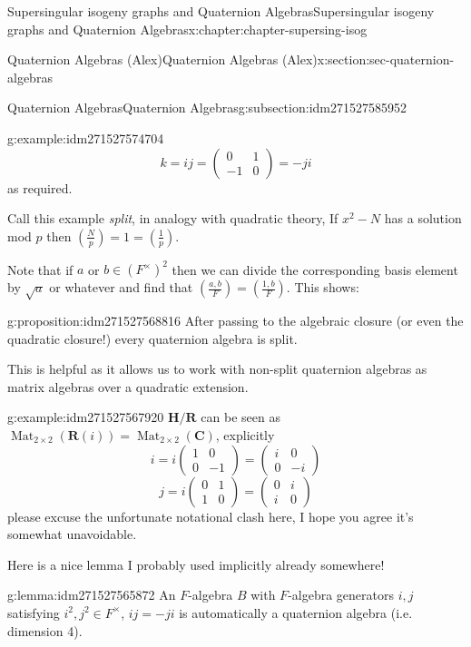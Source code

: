 \documentclass[oneside,10pt,]{book}
\numberwithin{equation}{section}
\newcommand{\legendre}[2]{\left(\frac{#1}{#2}\right)}
\newcommand{\RR}{\mathbf{R}}
\newcommand{\CC}{\mathbf{C}}
\newcommand{\HH}{\mathbf{H}}
\DeclareMathOperator{\Mat}{Mat}
\newcommand{\amp}{&}
\begin{document}
\begin{chapterptx}{Supersingular isogeny graphs and Quaternion Algebras}{}{Supersingular isogeny graphs and Quaternion Algebras}{}{}{x:chapter:chapter-supersing-isog}
\begin{sectionptx}{Quaternion Algebras (Alex)}{}{Quaternion Algebras (Alex)}{}{}{x:section:sec-quaternion-algebras}
\begin{subsectionptx}{Quaternion Algebras}{}{Quaternion Algebras}{}{}{g:subsection:idm271527585952}
\begin{introduction}{}
\begin{example}{}{g:example:idm271527574704}
\begin{equation*}
k = ij = \begin{pmatrix} 0\amp1\\-1\amp 0\end{pmatrix} = -ji
\end{equation*}
as required.%
\end{example}
Call this example \emph{split}, in analogy with quadratic theory,  If \(x^2 - N\) has a solution mod \(p\) then \(\legendre{N}{p} = 1 = \legendre{1}{p}\).%
\par
Note that if \(a\) or \(b \in (F^\times)^2\) then we can divide the corresponding basis element by \(\sqrt{a}\) or whatever and find that \(\legendre{a,b}{F} = \legendre{1,b}{F}\). This shows:%
\begin{proposition}{}{}{g:proposition:idm271527568816}%
After passing to the algebraic closure (or even the quadratic closure!) every quaternion algebra is split.%
\end{proposition}
This is helpful as it allows us to work with non-split quaternion algebras as matrix algebras over a quadratic extension.%
\begin{example}{}{g:example:idm271527567920}%
\(\HH/\RR\) can be seen as \(\Mat_{2\times 2}(\RR(i)) = \Mat_{2\times 2}(\CC)\), explicitly%
\begin{equation*}
i=  i\begin{pmatrix} 1\amp0\\0\amp -1\end{pmatrix} = \begin{pmatrix} i\amp0\\0\amp -i\end{pmatrix}
\end{equation*}
%
\begin{equation*}
j = i\begin{pmatrix} 0\amp1\\1\amp 0\end{pmatrix} = \begin{pmatrix} 0\amp i\\i\amp 0\end{pmatrix}
\end{equation*}
please excuse the unfortunate notational clash here, I hope you agree it's somewhat unavoidable.%
\end{example}
Here is a nice lemma I probably used implicitly already somewhere!%
\begin{lemma}{}{}{g:lemma:idm271527565872}%
An \(F\)-algebra \(B\) with \(F\)-algebra generators \(i,j\) satisfying \(i^2,j^2\in F^\times\), \(ij = -ji\) is automatically a quaternion algebra (i.e. dimension 4).%

\end{lemma}
\end{introduction}
\end{subsectionptx}
\end{sectionptx}
\end{chapterptx}
\end{document}
